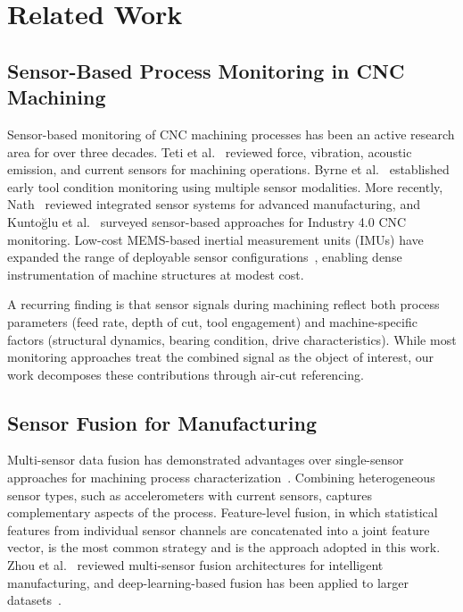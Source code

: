 \section{Related Work}\label{sec:related_work}

\subsection{Sensor-Based Process Monitoring in CNC Machining}

Sensor-based monitoring of CNC machining processes has been an active research area for over three decades. Teti et al.~\cite{teti2010advanced} reviewed force, vibration, acoustic emission, and current sensors for machining operations. Byrne et al.~\cite{byrne1995tool} established early tool condition monitoring using multiple sensor modalities. More recently, Nath~\cite{nath2020integrated} reviewed integrated sensor systems for advanced manufacturing, and Kuntoğlu et al.~\cite{kuntoglu2021review} surveyed sensor-based approaches for Industry 4.0 CNC monitoring. Low-cost MEMS-based inertial measurement units (IMUs) have expanded the range of deployable sensor configurations~\cite{mohring2012imu}, enabling dense instrumentation of machine structures at modest cost.

A recurring finding is that sensor signals during machining reflect both process parameters (feed rate, depth of cut, tool engagement) and machine-specific factors (structural dynamics, bearing condition, drive characteristics). While most monitoring approaches treat the combined signal as the object of interest, our work decomposes these contributions through air-cut referencing.

\subsection{Sensor Fusion for Manufacturing}

Multi-sensor data fusion has demonstrated advantages over single-sensor approaches for machining process characterization~\cite{cai2017sensor, sick2002online}. Combining heterogeneous sensor types, such as accelerometers with current sensors, captures complementary aspects of the process. Feature-level fusion, in which statistical features from individual sensor channels are concatenated into a joint feature vector, is the most common strategy and is the approach adopted in this work. Zhou et al.~\cite{zhou2023multisensor} reviewed multi-sensor fusion architectures for intelligent manufacturing, and deep-learning-based fusion has been applied to larger datasets~\cite{zhao2019deeplearning}.

